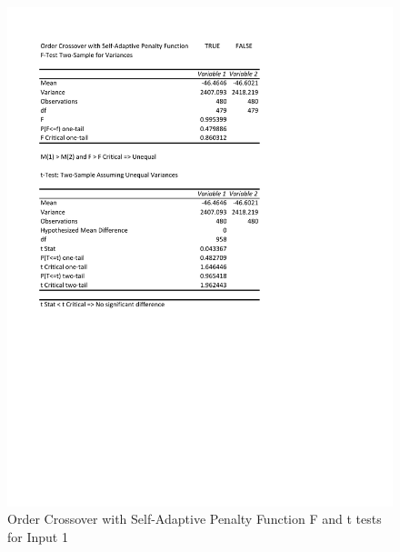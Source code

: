 \documentclass[times]{article}
\begin{document}
	\begin{figure}
		\caption{Order Crossover with Self-Adaptive Penalty Function F and t tests for Input 1}
		\label{fig:order_sa_penalty1}
		\includegraphics[width=\textwidth]{./t_test/order_crossover_sa_penalty1}
	\end{figure}
\end{document}
